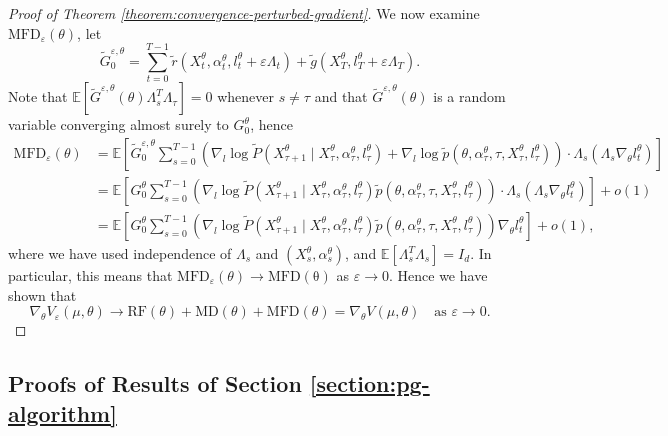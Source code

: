 \documentclass[11pt]{article}
\numberwithin{equation}{section}
\theoremstyle{definition}
\theoremstyle{remark}
\def\eps{\varepsilon}
\begin{document}
\begin{proof}[Proof of Theorem \ref{theorem:convergence-perturbed-gradient}]
We now examine $\mathrm{MFD}_{\eps}(\theta)$, let
\[
 \tilde G^{\eps,\theta}_0 = \sum_{t = 0}^{T - 1} \tilde r(X_t^\theta,  \alpha_t^{\theta},  l_t^\theta + \eps \Lambda_t) + \tilde g(X_T^{\theta}, l^{\theta}_T + \eps \Lambda_T).
\]
Note that $\mathbb E[\tilde G^{\eps, \theta} (\theta) \Lambda_s^T \Lambda_\tau ] = 0$ whenever $s \neq \tau$ and that $\tilde G^{\eps, \theta}(\theta)$ is a random variable converging almost surely to $G_0^\theta$, hence
\[
\begin{aligned}
    \mathrm{MFD}_{\eps}(\theta) &= \mathbb E\left[\tilde G^{\eps, \theta}_0 \sum_{s = 0}^{T - 1} \left( \nabla_l \log \tilde P(X_{\tau + 1}^\theta \mid  X_\tau^{\theta},\alpha_\tau^\theta, l_\tau^\theta) + \nabla_l \log \tilde p(\theta, \alpha_\tau^\theta,\tau,X_\tau^{\theta}, l_\tau^\theta)\right) \cdot \Lambda_s \left(\Lambda_s \nabla_\theta l_t^\theta  \right)  \right] \\
    &= \mathbb E\left[G_0^\theta \sum_{s = 0}^{T - 1} \left( \nabla_l \log \tilde P(X_{\tau + 1}^\theta \mid  X_\tau^{\theta},\alpha_\tau^\theta,  l_\tau^\theta) \tilde p(\theta, \alpha_\tau^\theta,\tau,X_\tau^{\theta}, l_\tau^\theta)\right) \cdot \Lambda_s \left( \Lambda_s \nabla_\theta l_t^\theta \right) \right] + o (1) \\
    &=\mathbb E\left[G_0^\theta\sum_{s = 0}^{T - 1} \left( \nabla_l \log \tilde P(X_{\tau + 1}^\theta \mid  X_\tau^{\theta},\alpha_\tau^\theta, l_\tau^\theta ) \tilde p(\theta, \alpha_\tau^\theta,\tau,X_\tau^{\theta}, l_\tau^\theta)\right) \nabla_\theta l_t^\theta \right] + o (1),
\end{aligned}
\]
where we have used independence of $\Lambda_s$ and $(X_s^\theta, \alpha_s^\theta)$, and $\mathbb E[ \Lambda_s^T \Lambda_s ] = I_d$. 
In particular, this means that $\mathrm{MFD}_\eps(\theta) \to \mathrm{MFD(\theta)}$ as $\eps \to 0$.
Hence we have shown that
\[
\nabla_\theta V_\eps(\mu, \theta) \rightarrow \mathrm{RF}(\theta) + \mathrm{MD}(\theta) + \mathrm{MFD}(\theta) = \nabla _\theta V(\mu, \theta) \quad \text{as } \eps \to 0.
\]
\end{proof}

\subsection{Proofs of Results of Section \ref{section:pg-algorithm}}
\end{document}
